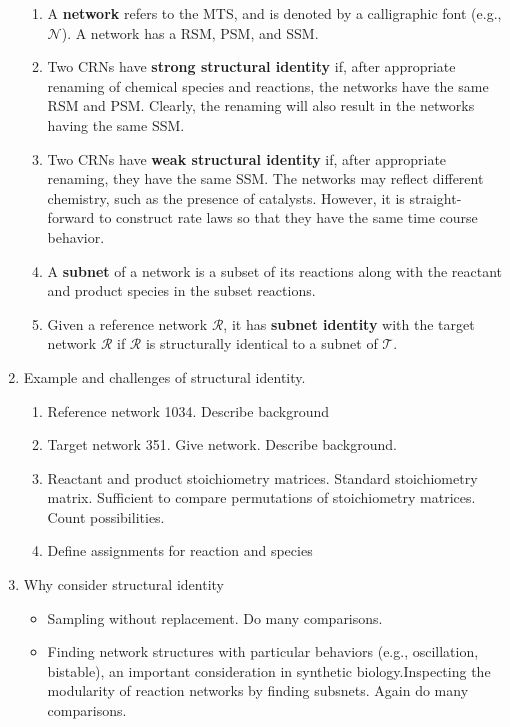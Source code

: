 \documentclass{article}
\begin{document}
\begin{enumerate}
\begin{enumerate}
        \item A {\bf network} refers to the MTS, and is denoted by a calligraphic font (e.g., $\mathcal{N}$). A network has a RSM, PSM, and SSM.
        
        \item Two CRNs have {\bf strong structural identity} if, after appropriate renaming of chemical species and reactions, the networks have the same RSM and PSM. Clearly, the renaming will also result in the networks having the same SSM.
        
        \item Two CRNs have {\bf weak structural identity} if, after appropriate renaming, they have the same SSM. The networks may reflect different chemistry, such as the presence of catalysts. However, it is straight-forward to construct rate laws so that they have the same time course behavior.
        
        \item A {\bf subnet} of a network is a subset of its reactions along with the reactant and product species in the subset reactions.

        \item Given a reference network $\mathcal{R}$, it has {\bf subnet identity} with the target network $\mathcal{R}$ if $\mathcal{R}$ is structurally identical to a subnet of $\mathcal{T}$.
        
    \end{enumerate}

    \item Example and challenges of structural identity.
    \begin{enumerate}
        \item Reference network 1034. Describe background
        \item Target network 351. Give network. Describe background.
        \item Reactant and product stoichiometry matrices. Standard stoichiometry matrix. Sufficient to compare permutations of stoichiometry matrices. Count possibilities.
        \item Define assignments for reaction and species
    \end{enumerate}

    
    \item Why consider structural identity
    \begin{itemize}
        \item Sampling without replacement. Do many comparisons.
        \item Finding network structures with particular behaviors (e.g., oscillation, bistable), an important consideration in synthetic biology.Inspecting the modularity of reaction networks by finding subsnets. Again do many comparisons.
    \end{itemize}


\end{enumerate}
\end{document}
